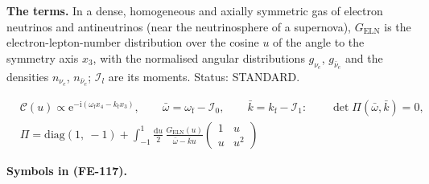 \documentclass[
  10pt,
]{article}
\begin{document}
\textbf{The terms.} In a dense, homogeneous and axially symmetric gas of
electron neutrinos and antineutrinos (near the neutrinosphere of a
supernova), \(G_{\mathrm{ELN}}\) is the electron-lepton-number
distribution over the cosine \(u\) of the angle to the symmetry axis
\(x_3\), with the normalised angular distributions \(g_{\nu_e}\),
\(g_{\bar\nu_e}\) and the densities \(n_{\nu_e}\), \(n_{\bar\nu_e}\);
\(\mathcal{I}_l\) are its moments. Status: STANDARD.

\[
\begin{aligned}
&\mathcal{C}(u) \propto \mathrm{e}^{-\mathrm{i}(\omega_{\mathrm{f}}x_4 - k_{\mathrm{f}}x_3)},\qquad
 \bar\omega = \omega_{\mathrm{f}} - \mathcal{I}_0,
 \qquad \bar k = k_{\mathrm{f}} - \mathcal{I}_1:\qquad \det\Pi(\bar\omega, \bar k) = 0,\\
&\Pi = \mathrm{diag}(1,\ -1) + \int_{-1}^{1}\frac{\mathrm{d}u}{2}\,\frac{G_{\mathrm{ELN}}(u)}{\bar\omega
 - \bar ku}
 \begin{pmatrix}1 & u\\ u & u^2\end{pmatrix}
\end{aligned} \tag{FE-117}
\]

\textbf{Symbols in (FE-117).}
\end{document}
